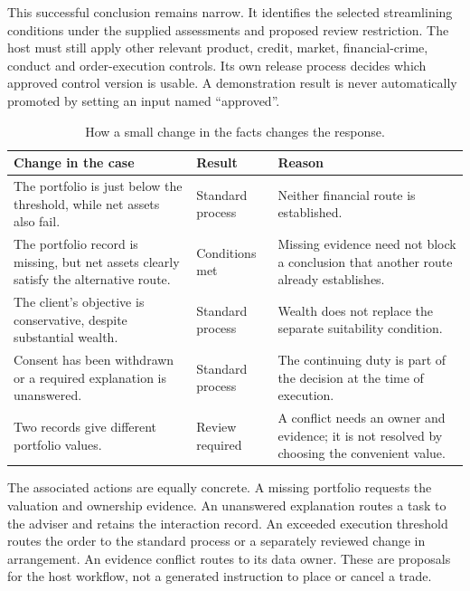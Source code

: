 This successful conclusion remains narrow. It identifies the selected
streamlining conditions under the supplied assessments and proposed review
restriction. The host must still apply other relevant product, credit, market,
financial-crime, conduct and order-execution controls. Its own release process
decides which approved control version is usable. A demonstration result is
never automatically promoted by setting an input named ``approved''.


\begin{table}[H]
\centering
\caption{How a small change in the facts changes the response.}
\label{tab:dry-cases-summary}
\begin{tabularx}{0.96\textwidth}{P{0.35\textwidth}P{0.22\textwidth}Y}
\toprule
Change in the case & Result & Reason \\ \midrule
The portfolio is just below the threshold, while net assets also fail. & Standard process & Neither financial route is established. \\
\addlinespace[0.5em]
The portfolio record is missing, but net assets clearly satisfy the alternative route. & Conditions met & Missing evidence need not block a conclusion that another route already establishes. \\
\addlinespace[0.5em]
The client's objective is conservative, despite substantial wealth. & Standard process & Wealth does not replace the separate suitability condition. \\
\addlinespace[0.5em]
Consent has been withdrawn or a required explanation is unanswered. & Standard process & The continuing duty is part of the decision at the time of execution. \\
\addlinespace[0.5em]
Two records give different portfolio values. & Review required & A conflict needs an owner and evidence; it is not resolved by choosing the convenient value. \\
\bottomrule
\end{tabularx}
\end{table}


The associated actions are equally concrete. A missing portfolio requests the
valuation and ownership evidence. An unanswered explanation routes a task to the
adviser and retains the interaction record. An exceeded execution threshold
routes the order to the standard process or a separately reviewed change in
arrangement. An evidence conflict routes to its data owner. These are proposals
for the host workflow, not a generated instruction to place or cancel a trade.

